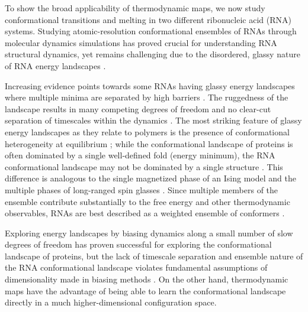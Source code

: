 To show the broad applicability of thermodynamic maps, we now study conformational transitions and melting in two different ribonucleic acid (RNA) systems. Studying atomic-resolution conformational ensembles of RNAs through molecular dynamics simulations has proved crucial for understanding RNA structural dynamics, yet remains challenging due to the disordered, glassy nature of RNA energy landscapes \cite{DE-Shaw-RNA-ff,bussi-ff-deficiency}.

Increasing evidence points towards some RNAs having glassy energy landscapes where multiple minima are separated by high barriers \cite{kremer-polymer,parisi-RNA,wales-RNA}. The ruggedness of the landscape results in many competing degrees of freedom and no clear-cut separation of timescales within the dynamics \cite{hashimi-glass,wales-RNA,parisi-RNA}. The most striking feature of glassy energy landscapes as they relate to polymers is the presence of conformational heterogeneity at equilibrium \cite{parisi-RNA, kremer-ML};  while the conformational landscape of proteins is often dominated by a single well-defined fold (energy minimum), the RNA conformational landscape may not be dominated by a single structure \cite{hashimi-invisible,hashimi-nmr-dock}. This difference is analogous to the single magnetized phase of an Ising model and the multiple phases of long-ranged spin glasses \cite{parisi-replica-trick, ANNNI,hopfield-network,amit-spin-glass}.  Since multiple members of the ensemble contribute substantially to the free energy and other thermodynamic observables, RNAs are best described as a weighted ensemble of conformers \cite{how-to-think,hashimi-nmr-dock}. 

Exploring energy landscapes by biasing dynamics along a small number of slow degrees of freedom has proven successful for exploring the conformational landscape of proteins, but the lack of timescale separation and ensemble nature of the RNA conformational landscape violates fundamental assumptions of dimensionality made in biasing methods \cite{metadynamics-review}. On the other hand, thermodynamic maps have the advantage of being able to learn the conformational landscape directly in a much higher-dimensional configuration space.

